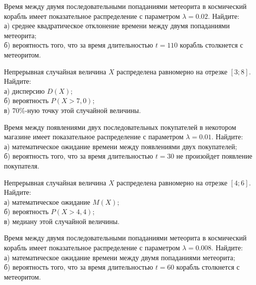 \vfill

\z Время между двумя последовательными попаданиями метеорита в космический корабль имеет показательное распределение с параметром $\lambda = 0.02$. Найдите: \\ \quad а) среднее квадратическое отклонение времени между двумя попаданиями метеорита; \\ \quad б) вероятность того, что за время длительностью $t = 110$ корабль  столкнется с метеоритом.
 

\vfill

\newpage\setcounter{zad}{0}

\z Непрерывная случайная величина $X$ распределена равномерно на отрезке $[3; 8]$. Найдите: \\ \quad а) дисперсию $D(X)$; \\ \quad б) вероятность $P(X>7{,}0)$; \\ \quad в) $70\%$-ную точку этой случайной величины.


\vfill

\z Время между появлениями двух последовательных покупателей в некотором магазине имеет показательное распределение с параметром $\lambda = 0.01$. Найдите: \\ \quad а) математическое ожидание времени между появлениями двух покупателей; \\ \quad б) вероятность того, что за время длительностью $t = 30$ не произойдет появление покупателя.
 

\vfill

\newpage\setcounter{zad}{0}

\z Непрерывная случайная величина $X$ распределена равномерно на отрезке $[4; 6]$. Найдите: \\ \quad а) математическое ожидание $M(X)$; \\ \quad б) вероятность $P(X>4{,}4)$; \\ \quad в) медиану этой случайной величины.


\vfill

\z Время между двумя последовательными попаданиями метеорита в космический корабль имеет показательное распределение с параметром $\lambda = 0.008$. Найдите: \\ \quad а) математическое ожидание времени между двумя попаданиями метеорита; \\ \quad б) вероятность того, что за время длительностью $t = 60$ корабль  столкнется с метеоритом.
 

\vfill

\newpage\setcounter{zad}{0}

